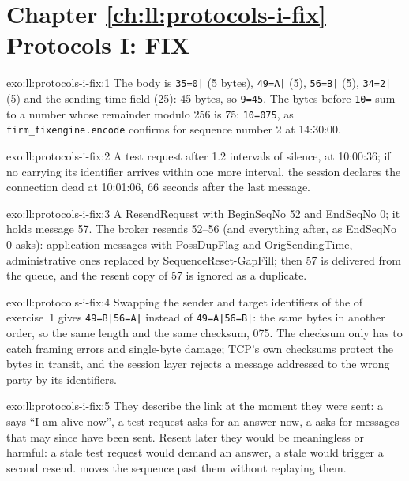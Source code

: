 \section*{Chapter \ref{ch:ll:protocols-i-fix} --- Protocols I: FIX}

\begin{solution}{exo:ll:protocols-i-fix:1}
The body is \texttt{35=0|} (5 bytes), \texttt{49=A|} (5), \texttt{56=B|} (5), \texttt{34=2|} (5) and the sending time field (25):
45 bytes, so \texttt{9=45}. The bytes before \texttt{10=} sum to a number whose remainder modulo 256 is 75: \texttt{10=075}, as
\texttt{firm\_fixengine.encode} confirms for sequence number 2 at 14:30:00.
\end{solution}

\begin{solution}{exo:ll:protocols-i-fix:2}
A test request after 1.2 intervals of silence, at 10:00:36; if no  carrying its identifier arrives within one more
interval, the session declares the connection dead at 10:01:06, 66 seconds after the last message.
\end{solution}

\begin{solution}{exo:ll:protocols-i-fix:3}
A ResendRequest with BeginSeqNo 52 and EndSeqNo 0; it holds message 57. The broker resends 52--56 (and everything after, as
EndSeqNo 0 asks): application messages with PossDupFlag and OrigSendingTime, administrative ones replaced by
SequenceReset-GapFill; then 57 is delivered from the queue, and the resent copy of 57 is ignored as a duplicate.
\end{solution}

\begin{solution}{exo:ll:protocols-i-fix:4}
Swapping the sender and target identifiers of the  of exercise~1 gives \texttt{49=B|56=A|} instead of
\texttt{49=A|56=B|}: the same bytes in another order, so the same length and the same checksum, 075. The checksum only has to
catch framing errors and single-byte damage; TCP's own checksums protect the bytes in transit, and the session layer rejects
a message addressed to the wrong party by its identifiers.
\end{solution}

\begin{solution}{exo:ll:protocols-i-fix:5}
They describe the link at the moment they were sent: a  says ``I am alive now'', a test request asks for an answer
now, a  asks for messages that may since have been sent. Resent later they would be meaningless or harmful: a
stale test request would demand an answer, a stale  would trigger a second resend.  moves the sequence
past them without replaying them.
\end{solution}

